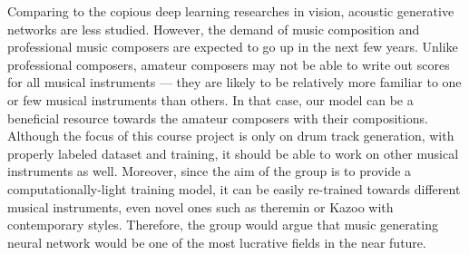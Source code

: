 \begin{par}
    \par \hspace{15pt} Comparing to the copious deep learning researches in vision, acoustic generative networks are less studied. However, the demand of music composition and professional music composers are expected to go up in the next few years. Unlike professional composers, amateur composers may not be able to write out scores for all musical instruments --- they are likely to be relatively more familiar to one or few musical instruments than others. In that case, our model can be a beneficial resource towards the amateur composers with their compositions. Although the focus of this course project is only on drum track generation, with properly labeled dataset and training, it should be able to work on other musical instruments as well. Moreover, since the aim of the group is to provide a computationally-light training model, it can be easily re-trained towards different musical instruments, even novel ones such as theremin or Kazoo with contemporary styles. Therefore, the group would argue that music generating neural network would be one of the most lucrative fields in the near future. 
\end{par}